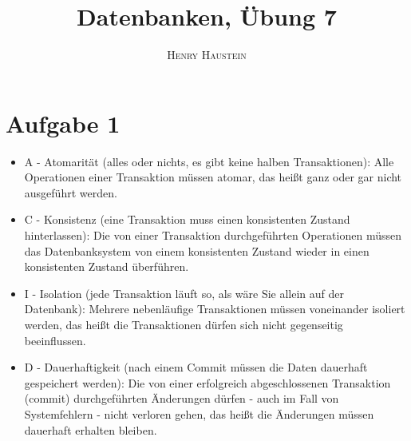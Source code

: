 \documentclass{article}
\title{\textbf{Datenbanken, Übung 7}}
\author{\textsc{Henry Haustein}}
\date{}
\begin{document}
	\maketitle
	
	\section*{Aufgabe 1}
	\begin{itemize}
		\item A - Atomarität (alles oder nichts, es gibt keine halben Transaktionen): Alle Operationen einer Transaktion müssen atomar, das heißt ganz oder gar nicht ausgeführt werden.
		\item C - Konsistenz (eine Transaktion muss einen konsistenten Zustand hinterlassen): Die von einer Transaktion durchgeführten Operationen müssen das Datenbanksystem von einem konsistenten Zustand wieder in einen konsistenten Zustand überführen.
		\item I - Isolation (jede Transaktion läuft so, als wäre Sie allein auf der Datenbank): Mehrere nebenläufige Transaktionen müssen voneinander isoliert werden, das heißt die Transaktionen dürfen sich nicht gegenseitig beeinflussen.
		\item D - Dauerhaftigkeit (nach einem Commit müssen die Daten dauerhaft gespeichert werden): Die von einer erfolgreich abgeschlossenen Transaktion (commit) durchgeführten Änderungen dürfen  - auch im Fall von Systemfehlern - nicht verloren gehen, das heißt die Änderungen müssen dauerhaft erhalten bleiben.
	\end{itemize}
\end{document}
